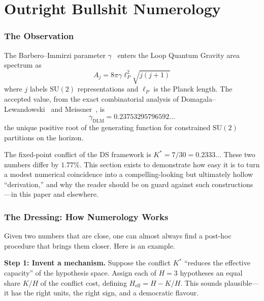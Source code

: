 \documentclass[11pt,a4paper]{article}
\theoremstyle{definition}
\theoremstyle{remark}
\newcommand{\SU}{\mathrm{SU}}
\begin{document}
\part{Outright Bullshit Numerology}\label{part:E}

\section{The Observation}\label{sec:BIobservation}

The Barbero--Immirzi parameter $\gamma$~\cite{Barbero1995,Immirzi1997} enters the Loop Quantum Gravity area spectrum as
\begin{equation}
A_j=8\pi\gamma\ell_P^2\sqrt{j(j+1)}
\end{equation}
where $j$ labels $\SU(2)$ representations and $\ell_P$ is the Planck length. The accepted value, from the exact combinatorial analysis of Domagala--Lewandowski~\cite{DL2004} and Meissner~\cite{Meissner2004}, is
\begin{equation}
\gamma_{\mathrm{DLM}}=0.23753295796592\ldots
\end{equation}
the unique positive root of the generating function for constrained $\SU(2)$ partitions on the horizon.

The fixed-point conflict of the DS framework is $K^*=7/30=0.2333\ldots$ These two numbers differ by $1.77\%$. This section exists to demonstrate how easy it is to turn a modest numerical coincidence into a compelling-looking but ultimately hollow ``derivation,'' and why the reader should be on guard against such constructions---in this paper and elsewhere.


\section{The Dressing: How Numerology Works}\label{sec:dressing}

Given two numbers that are close, one can almost always find a post-hoc procedure that brings them closer. Here is an example.

\textbf{Step 1: Invent a mechanism.} Suppose the conflict $K^*$ ``reduces the effective capacity'' of the hypothesis space. Assign each of $H=3$ hypotheses an equal share $K/H$ of the conflict cost, defining $H_{\mathrm{eff}}=H-K/H$. This sounds plausible---it has the right units, the right sign, and a democratic flavour.
\end{document}
